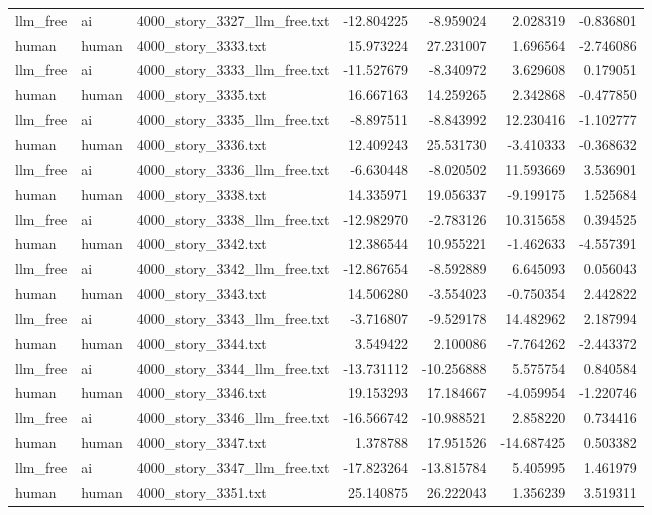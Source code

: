 \begin{longtable}{lllrrrr}
llm\_free & ai & 4000\_story\_3327\_llm\_free.txt & -12.804225 & -8.959024 & 2.028319 & -0.836801 \\
human & human & 4000\_story\_3333.txt & 15.973224 & 27.231007 & 1.696564 & -2.746086 \\
llm\_free & ai & 4000\_story\_3333\_llm\_free.txt & -11.527679 & -8.340972 & 3.629608 & 0.179051 \\
human & human & 4000\_story\_3335.txt & 16.667163 & 14.259265 & 2.342868 & -0.477850 \\
llm\_free & ai & 4000\_story\_3335\_llm\_free.txt & -8.897511 & -8.843992 & 12.230416 & -1.102777 \\
human & human & 4000\_story\_3336.txt & 12.409243 & 25.531730 & -3.410333 & -0.368632 \\
llm\_free & ai & 4000\_story\_3336\_llm\_free.txt & -6.630448 & -8.020502 & 11.593669 & 3.536901 \\
human & human & 4000\_story\_3338.txt & 14.335971 & 19.056337 & -9.199175 & 1.525684 \\
llm\_free & ai & 4000\_story\_3338\_llm\_free.txt & -12.982970 & -2.783126 & 10.315658 & 0.394525 \\
human & human & 4000\_story\_3342.txt & 12.386544 & 10.955221 & -1.462633 & -4.557391 \\
llm\_free & ai & 4000\_story\_3342\_llm\_free.txt & -12.867654 & -8.592889 & 6.645093 & 0.056043 \\
human & human & 4000\_story\_3343.txt & 14.506280 & -3.554023 & -0.750354 & 2.442822 \\
llm\_free & ai & 4000\_story\_3343\_llm\_free.txt & -3.716807 & -9.529178 & 14.482962 & 2.187994 \\
human & human & 4000\_story\_3344.txt & 3.549422 & 2.100086 & -7.764262 & -2.443372 \\
llm\_free & ai & 4000\_story\_3344\_llm\_free.txt & -13.731112 & -10.256888 & 5.575754 & 0.840584 \\
human & human & 4000\_story\_3346.txt & 19.153293 & 17.184667 & -4.059954 & -1.220746 \\
llm\_free & ai & 4000\_story\_3346\_llm\_free.txt & -16.566742 & -10.988521 & 2.858220 & 0.734416 \\
human & human & 4000\_story\_3347.txt & 1.378788 & 17.951526 & -14.687425 & 0.503382 \\
llm\_free & ai & 4000\_story\_3347\_llm\_free.txt & -17.823264 & -13.815784 & 5.405995 & 1.461979 \\
human & human & 4000\_story\_3351.txt & 25.140875 & 26.222043 & 1.356239 & 3.519311 \\

\end{longtable}
